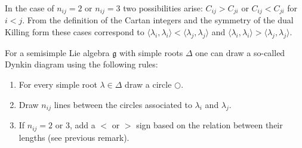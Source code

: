    \begin{remark}
        In the case of $n_{ij} = 2$ or $n_{ij} = 3$ two possibilities arise: $C_{ij}>C_{ji}$ or $C_{ij}<C_{ji}$ for $i<j$. From the definition of the Cartan integers and the symmetry of the dual Killing form these cases correspond to $\langle\lambda_i,\lambda_i\rangle<\langle\lambda_j,\lambda_j\rangle$ and $\langle\lambda_i,\lambda_i\rangle>\langle\lambda_j,\lambda_j\rangle$.
    \end{remark}

    \begin{construct}\label{lie:construct_dynkin}
        For a semisimple Lie algebra $\mathfrak{g}$ with simple roots $\Delta$ one can draw a so-called Dynkin diagram using the following rules:
        \begin{enumerate}
            \item For every simple root $\lambda\in\Delta$ draw a circle $\bigcirc$.
            \item Draw $n_{ij}$ lines between the circles associated to $\lambda_i$ and $\lambda_j$.
            \item If $n_{ij}=2$ or 3, add a $<$ or $>$ sign based on the relation between their lengths (see previous remark).
        \end{enumerate}
    \end{construct}

